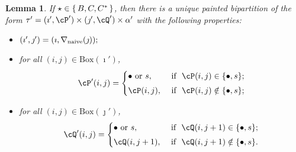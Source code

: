 \documentclass[12pt,a4paper]{amsart}
\def\DD{\nabla}
\numberwithin{equation}{section}
\newtheorem{lem}[thm]{Lemma}
\theoremstyle{remark}
\def\BOX{\mathrm{Box}}
\begin{document}
\begin{lem}\label{lemDDn1}
  If $\star \in \set{B,C,C^*}$, then there is a unique painted bipartition of the form $\tau'= (\imath',\cP')\times (\jmath',\cQ')\times \alpha'$ with the following properties:
  \begin{itemize}
        \item $
   (\imath',\jmath')= (\imath,\DD_\mathrm{naive}(\jmath)); \smallskip
   $
   \item for all $(i,j)\in \BOX(\imath')$,
   \[
     \cP'(i,j)=\begin{cases}
    \bullet \textrm{ or } s,&\textrm{ if  $\ \cP(i,j)\in \{\bullet, s\}$;} \smallskip \\
  \cP(i,j),& \textrm{ if $\ \cP(i,j)\notin \{\bullet, s\}$};\end{cases}
   \]
   \item for all $(i,j)\in \BOX(\jmath')$,
   \[
     \cQ'(i,j)=\begin{cases}
    \bullet \textrm{ or } s,&\textrm{ if  $\ \cQ(i,j+1)\in \{\bullet, s\}$;} \smallskip \\
  \cQ(i,j+1), & \textrm{ if $\ \cQ(i,j+1)\notin \{\bullet, s\}$}.  \end{cases}
   \]
    \end{itemize}
    \end{lem}
\end{document}
